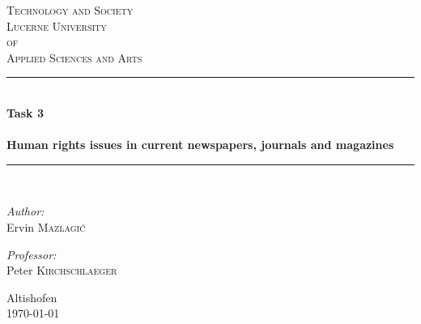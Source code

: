 \begin{titlepage}

\begin{center}

\textsc{\LARGE Technology and Society}\\[1.5cm]

\textsc{\Large Lucerne University\\ of\\ Applied Sciences and Arts}\\[0.5cm]

\vfill{}

\newcommand{\HRule}{\rule{\linewidth}{0.5mm}}
\HRule \\[0.4cm]
{   \Huge \bfseries Task 3\\
        ~\\
        \large Human rights issues in current newspapers, journals and magazines}\\[0.4cm]

\HRule \\[1.5cm]

\begin{minipage}{0.4\textwidth}
    \begin{flushleft} \large
        \emph{Author:}\\
        Ervin \textsc{Mazlagi\'c}\\
    \end{flushleft}
\end{minipage}
\hfill
\begin{minipage}{0.4\textwidth}
    \begin{flushright} \large
        \emph{Professor:} \\
        Peter \textsc{Kirchschlaeger} \\
    \end{flushright}
\end{minipage}

\vfill{}
\vfill{}
\vfill{}

{\large Altishofen\\ \today}

\end{center}

\end{titlepage}
